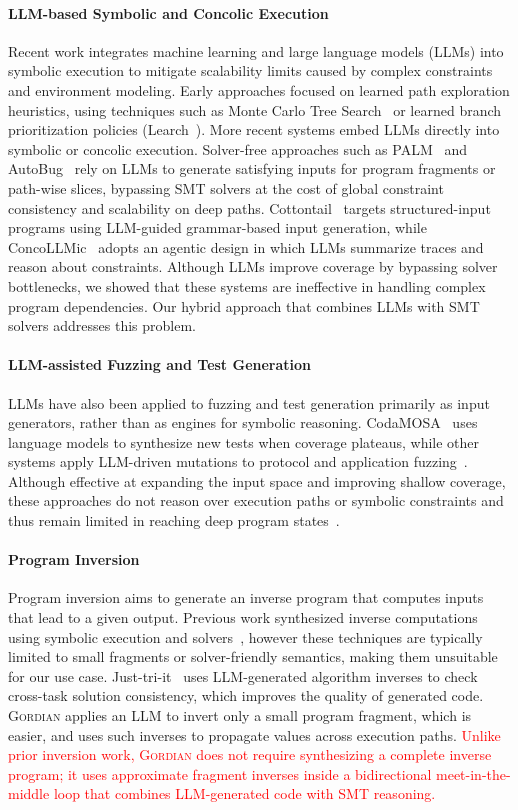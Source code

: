\documentclass[acmsmall,screen,nonacm]{acmart}
\newcommand{\rev}[1]{\textcolor{red}{#1}}
\newcommand{\rev}[1]{#1}
\newcommand{\projName}{\textsc{Gordian}\xspace}
\theoremstyle{definition}
\begin{document}
\paragraph*{LLM-based Symbolic and Concolic Execution} Recent work integrates machine learning and large language models (LLMs) into symbolic execution to mitigate scalability limits caused by complex constraints and environment modeling.
Early approaches focused on learned path exploration heuristics, using techniques such as Monte Carlo Tree Search~\cite{legion} or learned branch prioritization policies (Learch~\cite{learch}). More recent systems embed LLMs directly into symbolic or concolic execution. Solver-free approaches such as PALM~\cite{palm} and AutoBug~\cite{autobug} rely on LLMs to generate satisfying inputs for program fragments or path-wise slices, bypassing SMT solvers at the cost of global constraint consistency and scalability on deep paths. Cottontail~\cite{cottontail} targets structured-input programs using LLM-guided grammar-based input generation, while ConcoLLMic~\cite{concollmic} adopts an agentic design in which LLMs summarize traces and reason about constraints. Although LLMs improve coverage by bypassing solver bottlenecks, we showed that these systems are ineffective in handling complex program dependencies. Our hybrid approach that combines LLMs with SMT solvers addresses this problem.
\paragraph*{LLM-assisted Fuzzing and Test Generation}
LLMs have also been applied to fuzzing and test generation primarily as input generators, rather than as engines for symbolic reasoning. CodaMOSA~\cite{codamosa} uses language models to synthesize new tests when coverage plateaus, while other systems apply LLM-driven mutations to protocol and application fuzzing~\cite{chatfuzz,inputblaster}. Although effective at expanding the input space and improving shallow coverage, these approaches do not reason over execution paths or symbolic constraints and thus remain limited in reaching deep program states~\cite{manes_fuzzing_survey}.
\paragraph*{Program Inversion}
Program inversion aims to generate an inverse program that computes inputs that lead to a given output. Previous work synthesized inverse computations using symbolic execution and solvers~\cite{srivastava2011path,Abramov2000InverseComputation}, however these techniques are typically limited to small fragments or solver-friendly semantics, making them unsuitable for our use case. Just-tri-it~\cite{dai2025reducing} uses LLM-generated algorithm inverses to check cross-task solution consistency, which improves the quality of generated code. \projName applies an LLM to invert only a small program fragment, which is easier, and uses such inverses to propagate values across execution paths. \rev{Unlike prior inversion work, \projName does not require synthesizing a complete inverse program; it uses approximate fragment inverses inside a bidirectional meet-in-the-middle loop that combines LLM-generated code with SMT reasoning.}
\end{document}
